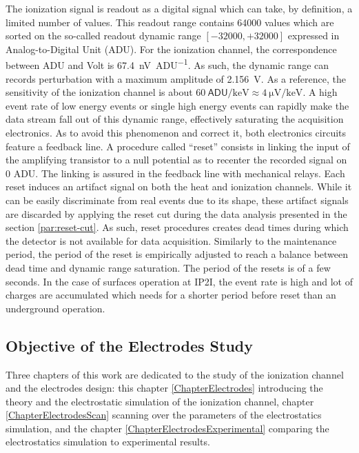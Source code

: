 The ionization signal is readout as a digital signal which can take, by definition, a limited number of values. This readout range contains 64000 values which are sorted on the so-called readout dynamic range $[-32000, +32000]$ expressed in Analog-to-Digital Unit (ADU). For the ionization channel, the correspondence between ADU and Volt is \SI{67.4}{\nano\volt\per\textsf{ADU}}. As such, the dynamic range can records perturbation with a maximum amplitude of \SI{2.156}{\volt}. As a reference, the sensitivity of the ionization channel is about $\SI{60}{\textsf{ADU}\per\kilo\eV} \approx \SI{4}{\micro\volt\per\kilo\eV}$. A high event rate of low energy events or single high energy events can rapidly make the data stream fall out of this dynamic range, effectively saturating the acquisition electronics.
As to avoid this phenomenon and correct it, both electronics circuits feature a feedback line. A procedure called “reset” consists in linking the input of the amplifying transistor to a null potential as to recenter the recorded signal on 0 ADU. The linking is assured in the feedback line with mechanical relays. Each reset induces an artifact signal on both the heat and ionization channels. While it can be easily discriminate from real events due to its shape, these artifact signals are discarded by applying the reset cut during the data analysis presented in the section \ref{par:reset-cut}. As such, reset procedures creates dead times during which the detector is not available for data acquisition. Similarly to the maintenance period, the period of the reset is empirically adjusted to reach a balance between dead time and dynamic range saturation. The period of the resets is of a few seconds. In the case of surfaces operation at IP2I, the event rate is high and lot of charges are accumulated which needs for a shorter period before reset than an underground operation.



\subsection{Objective of the Electrodes Study}
\label{par:ionization-objective}

Three chapters of this work are dedicated to the study of the ionization channel and the electrodes design: this chapter \ref{ChapterElectrodes} introducing the theory and the electrostatic simulation of the ionization channel,  chapter \ref{ChapterElectrodesScan} scanning over the parameters of the electrostatics simulation, and the chapter \ref{ChapterElectrodesExperimental} comparing the electrostatics simulation to experimental results.

